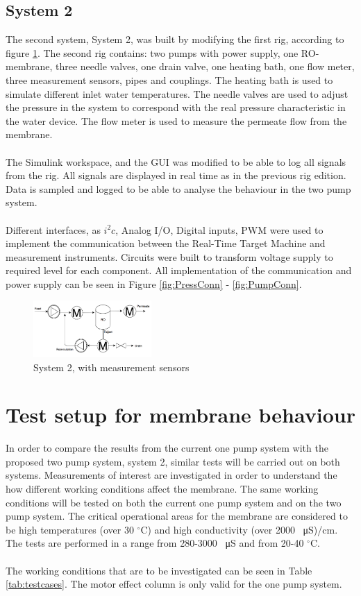 \subsection{System 2}
The second system, System 2, was built by modifying the first rig, according to figure \ref{fig:MeasSys2}. The second rig contains: two pumps with power supply, one RO-membrane, three needle valves, one drain valve, one heating bath, one flow meter, three measurement sensors, pipes and couplings. The heating bath is used to simulate different inlet water temperatures. The needle valves are used to adjust the pressure in the system to correspond with the real pressure characteristic in the water device. The flow meter is used to measure the permeate flow from the membrane. \\
\\
The Simulink workspace, and the GUI was modified to be able to log all signals from the rig. All signals are displayed in real time as in the previous rig edition. Data is sampled and logged to be able to analyse the behaviour in the two pump system.  \\
\\
Different interfaces, as $i^{2}c$, Analog I/O, Digital inputs, PWM were used to implement the communication between the Real-Time Target Machine and measurement instruments. Circuits were built to transform voltage supply to required level for each component. All implementation of the communication and power supply can be seen in Figure \ref{fig:PressConn} - \ref{fig:PumpConn}. 

\begin{figure}[h]
    \centering
    \includegraphics[width=0.4\textwidth]{MeasSys2}
    \caption{System 2, with measurement sensors}
    \label{fig:MeasSys2}
\end{figure}

\section{Test setup for membrane behaviour}
In order to compare the results from the current one pump system with the proposed two pump system, system 2, similar tests will be carried out on both systems. Measurements of interest are investigated in order to understand the how different working conditions affect the membrane. The same working conditions will be tested on both the current one pump system and on the two pump system. The critical operational areas for the membrane are considered to be high temperatures (over 30 $^\circ$C) and high conductivity (over 2000 \SI{}{\micro\siemens})/cm. The tests are performed in a range from 280-3000 \SI{}{\micro\siemens} and from 20-40 $^\circ$C. \\
\\
The working conditions that are to be investigated can be seen in Table \ref{tab:testcases}. The motor effect column is only valid for the one pump system. 


